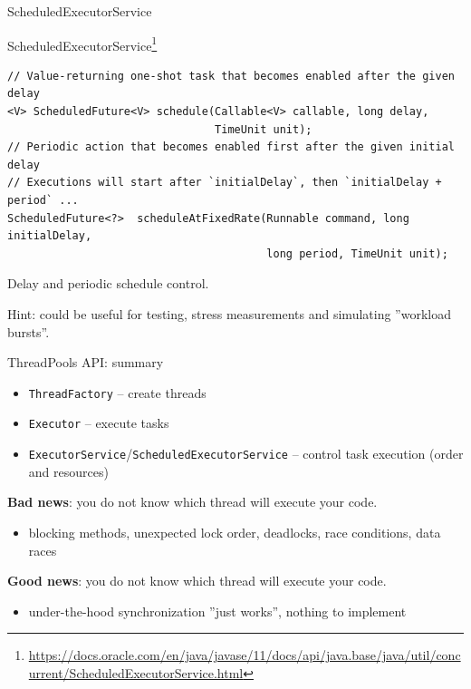 \begin{frame}[fragile]{ScheduledExecutorService}

ScheduledExecutorService\footnote{\tiny\url{https://docs.oracle.com/en/java/javase/11/docs/api/java.base/java/util/concurrent/ScheduledExecutorService.html}}

\begin{verbatim}
// Value-returning one-shot task that becomes enabled after the given delay
<V> ScheduledFuture<V> schedule(Callable<V> callable, long delay, 
                                TimeUnit unit);
// Periodic action that becomes enabled first after the given initial delay 
// Executions will start after `initialDelay`, then `initialDelay + period` ...
ScheduledFuture<?>  scheduleAtFixedRate(Runnable command, long initialDelay, 
                                        long period, TimeUnit unit);
\end{verbatim}

Delay and periodic schedule control.

Hint: could be useful for testing, stress measurements and simulating ''workload bursts''.
\end{frame}


\begin{frame}[fragile]{ThreadPools API: summary}

\begin{itemize}
    \item \texttt{ThreadFactory} -- create threads
    \item \texttt{Executor} -- execute tasks
    \item \texttt{ExecutorService}/\texttt{ScheduledExecutorService} -- control task execution (order and resources)
\end{itemize}

\pause

\textbf{Bad news}: you do not know which thread will execute your code.
\begin{itemize}
    \item blocking methods, unexpected lock order, deadlocks, race conditions, data races
\end{itemize}

\pause

\textbf{Good news}: you do not know which thread will execute your code.
\begin{itemize}
    \item under-the-hood synchronization ''just works'', nothing to implement
\end{itemize}

\end{frame}


